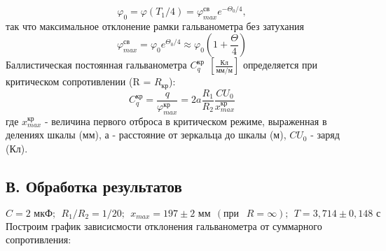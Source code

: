 \documentclass[a4paper,12pt]{article} %
\begin{document}
\begin{equation}
    \varphi_0 = \varphi(T_1/4) = \varphi^{\text{св}}_{max}e^{-\Theta_0/4},
\end{equation}
так что максимальное отклонение рамки гальванометра без затухания
\begin{equation}
    \varphi^{\text{св}}_{max} = \varphi_0e^{\Theta_0/4} \approx \varphi_0 \left(1 + \frac{\Theta}{4}\right)
\end{equation}
Баллистическая постоянная гальванометра $C^{\text{кр}}_q \ \ \left[\frac{\text{Кл}}{\text{мм/м}} \right]$ определяется при критическом сопротивлении (R = $R_\text{кр}$):
\begin{equation}
    C^{\text{кр}}_q = \frac{q}{\varphi^{\text{кр}}_{max}} = 2a \frac{R_1}{R_2}\frac{CU_0}{x^{\text{кр}}_{max}}
\end{equation}
где $x^{\text{кр}}_{max}$ - величина первого отброса в критическом режиме, выраженная в делениях шкалы (мм), а - расстояние от зеркальца до шкалы (м), $CU_0$ - заряд (Кл).
\newpage
\subsection{В. Обработка результатов}
\[
C = 2 \text{ мкФ}; \ \ R_1/R_2 = 1/20; \ \ x_{max} = 197 \pm 2 \text{ мм} \ \  (\text{при } \ \ R = \infty); \ \ T = 3,714 \pm 0,148 \text{ с}
\]
Построим график зависисмости отклонения гальванометра от суммарного сопротивления:
\end{document}
